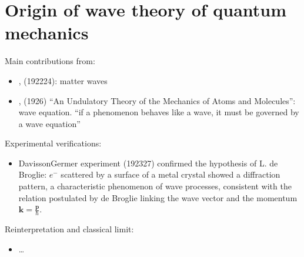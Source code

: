 \documentclass[letterpaper,10pt,english]{jupyterBook}
\begin{document}
\section{Origin of wave theory of quantum mechanics}
\label{\detokenize{ch/quantum-mechanics/history/origin-wave-mechanics:origin-of-wave-theory-of-quantum-mechanics}}\label{\detokenize{ch/quantum-mechanics/history/origin-wave-mechanics:quantum-mehcanics-history-origin-wave-mechanics}}\label{\detokenize{ch/quantum-mechanics/history/origin-wave-mechanics::doc}}
\sphinxAtStartPar
Main contributions from:
\begin{itemize}
\item {} 
\sphinxAtStartPar
{\hyperref[\detokenize{ch/quantum-mechanics/history/de-broglie:quantum-mehcanics-history-wave-mechanics-de-broglie}]{}}, (1922\sphinxhyphen{}24): matter waves

\item {} 
\sphinxAtStartPar
{\hyperref[\detokenize{ch/quantum-mechanics/history/schrodinger:quantum-mehcanics-history-wave-mechanics-schrodinger}]{}}, (1926) “An Undulatory Theory of the Mechanics of Atoms and Molecules”:  wave equation. “if a phenomenon behaves like a wave, it must be governed by a wave equation”

\end{itemize}

\sphinxAtStartPar
Experimental verifications:
\begin{itemize}
\item {} 
\sphinxAtStartPar
Davisson\sphinxhyphen{}Germer experiment (1923\sphinxhyphen{}27) confirmed the hypothesis of L. de Broglie: \(e^-\) scattered by a surface of a metal crystal showed a diffraction pattern, a characteristic phenomenon of wave processes, consistent with the relation postulated by de Broglie linking the wave vector and the momentum \(\mathbf{k} = \frac{\mathbf{p}}{\hbar}\).

\end{itemize}

\sphinxAtStartPar
Reinterpretation and classical limit:
\begin{itemize}
\item {} 
\sphinxAtStartPar
…

\end{itemize}

\sphinxstepscope
\end{document}
